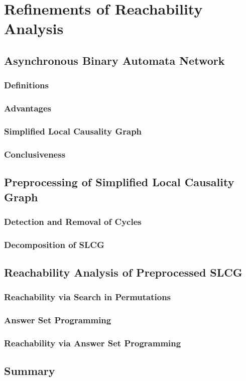 \chapter{Refinements of Reachability Analysis}
\section{Asynchronous Binary Automata Network}
\subsection{Definitions}
\subsection{Advantages}
\subsection{Simplified Local Causality Graph}
\subsection{Conclusiveness}

\section{Preprocessing of Simplified Local Causality Graph}
\subsection{Detection and Removal of Cycles}
\subsection{Decomposition of SLCG}
\section{Reachability Analysis of Preprocessed SLCG}
\subsection{Reachability via Search in Permutations}
\subsection{Answer Set Programming}
\subsection{Reachability via Answer Set Programming}
\section{Summary}